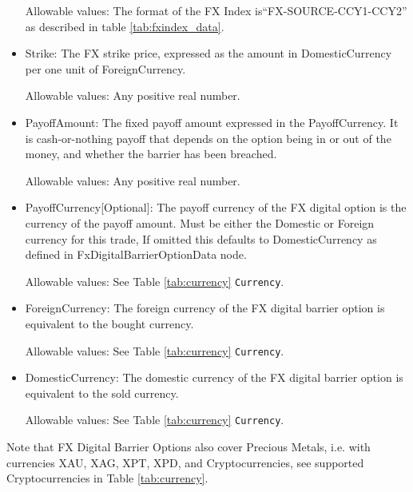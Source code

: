 \begin{itemize}
Allowable values:  The format of the FX Index is``FX-SOURCE-CCY1-CCY2'' as described in table \ref{tab:fxindex_data}. 
\item Strike: The FX strike price, expressed as the amount in DomesticCurrency per one unit of ForeignCurrency. 

Allowable values:  Any positive real number.

\item PayoffAmount: The fixed payoff amount expressed in the PayoffCurrency. It is cash-or-nothing payoff that depends on the option being in or out of the money, and whether the barrier has been breached.

Allowable values:  Any positive real number.

\item PayoffCurrency[Optional]: The payoff currency of the FX digital option is the currency of the payoff amount. Must be either the Domestic or Foreign currency for this trade, If omitted this defaults to DomesticCurrency as defined in FxDigitalBarrierOptionData node.

Allowable values:  See Table \ref{tab:currency} \lstinline!Currency!.

\item ForeignCurrency: The foreign currency of the FX digital barrier option is equivalent to the bought currency.  

Allowable values:  See Table \ref{tab:currency} \lstinline!Currency!.

\item DomesticCurrency: The domestic currency of the FX digital barrier option is equivalent to the sold currency. 

Allowable values:  See Table \ref{tab:currency} \lstinline!Currency!.

\end{itemize}

Note that FX Digital Barrier Options also cover Precious Metals, i.e. with
currencies XAU, XAG, XPT, XPD, and Cryptocurrencies,  see supported Cryptocurrencies in Table \ref{tab:currency}.
